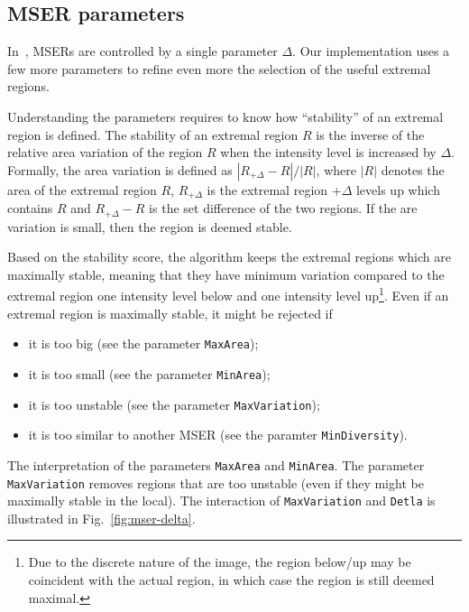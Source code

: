 \documentclass[9pt]{article}
\newcommand{\param}[1]{{\color{red}\tt   #1}}
\begin{document}
\subsection{MSER parameters}\label{mser.parameters}

In~\cite{matas03robust}, MSERs are controlled by a single parameter
$\Delta$. Our implementation uses a few more parameters to refine even
more the selection of the useful extremal regions.

Understanding the parameters requires to know how ``stability'' of an
extremal region is defined. The stability of an extremal region $R$ is
the inverse of the relative area variation of the region $R$ when the
intensity level is increased by $\Delta$. Formally, the area variation
is defined as $|R_{+\Delta} - R|/|R|$, where $|R|$ denotes the area of
the extremal region $R$, $R_{+\Delta}$ is the extremal region
$+\Delta$ levels up which contains $R$ and $R_{+\Delta} - R$ is the
set difference of the two regions. If the are variation is small, then
the region is deemed stable.

Based on the stability score, the algorithm keeps the extremal regions
which are maximally stable, meaning that they have minimum variation
compared to the extremal region one intensity level below and one
intensity level up\footnote{Due to the discrete nature of the image,
  the region below/up may be coincident with the actual region, in
  which case the region is still deemed maximal.}. Even if an extremal
region is maximally stable, it might be rejected if
\begin{itemize}
\raggedright
\item it is too big (see the parameter \param{MaxArea});
\item it is too small (see the parameter \param{MinArea});
\item it is too unstable (see the parameter \param{MaxVariation});
\item it is too similar to another MSER (see the
  paramter \param{MinDiversity}).
\end{itemize}

The interpretation of the parameters \param{MaxArea}
and \param{MinArea}. The parameter \verb$MaxVariation$ removes regions
that are too unstable (even if they might be maximally stable in the
local). The interaction of \verb$MaxVariation$ and \verb$Detla$ is
illustrated in Fig.~\ref{fig:mser-delta}.
\end{document}

